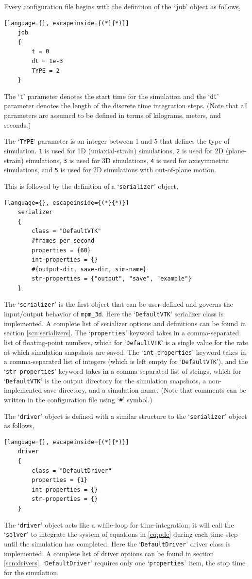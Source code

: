 Every configuration file begins with the definition of the `\texttt{job}' object as follows,
\begin{lstlisting}[language={}, escapeinside={(*}{*)}]
    job
    {
        t = 0
        dt = 1e-3
        TYPE = 2
    }
\end{lstlisting}
The `\texttt{t}' parameter denotes the start time for the simulation and the `\texttt{dt}' parameter denotes the length of the discrete time integration steps. (Note that all parameters are assumed to be defined in terms of kilograms, meters, and seconds.)

The `\texttt{TYPE}' parameter is an integer between 1 and 5 that defines the type of simulation. \texttt{1} is used for 1D (uniaxial-strain) simulations, \texttt{2} is used for 2D (plane-strain) simulations, \texttt{3} is used for 3D simulations, \texttt{4} is used for axisymmetric simulations, and \texttt{5} is used for 2D simulations with out-of-plane motion.

This is followed by the definition of a `\texttt{serializer}' object,
\begin{lstlisting}[language={}, escapeinside={(*}{*)}]
    serializer
    {
        class = "DefaultVTK"
        #frames-per-second
        properties = {60}
        int-properties = {}
        #{output-dir, save-dir, sim-name}
        str-properties = {"output", "save", "example"}
    }	
\end{lstlisting}
The `\texttt{serializer}' is the first object that can be user-defined and governs the input/output behavior of \texttt{mpm\_3d}. Here the `\texttt{DefaultVTK}' serializer class is implemented. A complete list of serializer options and definitions can be found in section \ref{scn:serializers}. The `\texttt{properties}' keyword takes in a comma-separated list of floating-point numbers, which for `\texttt{DefaultVTK}' is a single value for the rate at which simulation snapshots are saved. The `\texttt{int-properties}' keyword takes in a comma-separated list of integers (which is left empty for `\texttt{DefaultVTK}'), and the `\texttt{str-properties}' keyword takes in a comma-separated list of strings, which for `\texttt{DefaultVTK}' is the output directory for the simulation snapshots, a non-implemented save directory, and a simulation name. (Note that comments can be written in the configuration file using `\texttt{\#}' symbol.)

The `\texttt{driver}' object is defined with a similar structure to the `\texttt{serializer}' object as follows,
\begin{lstlisting}[language={}, escapeinside={(*}{*)}]
    driver
    {
        class = "DefaultDriver"
        properties = {1}
        int-properties = {}
        str-properties = {}
    }
\end{lstlisting}
The `\texttt{driver}' object acts like a while-loop for time-integration; it will call the `\texttt{solver}' to integrate the system of equations in \eqref{eq:pde} during each time-step until the simulation has completed. Here the `\texttt{DefaultDriver}' driver class is implemented. A complete list of driver options can be found in section \ref{scn:drivers}. `\texttt{DefaultDriver}' requires only one `\texttt{properties}' item, the stop time for the simulation.

